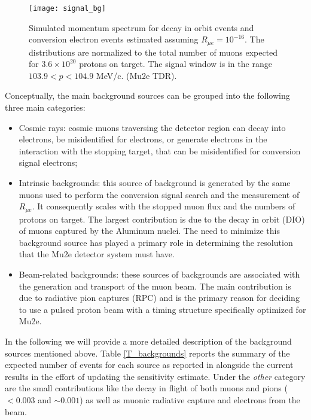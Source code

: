 \documentclass[12pt,a4paper,openright, oneside, titlepage]{book} %
\begin{document}
\begin{figure}[h!]
\centering
\texttt{[image: signal\_bg]}
\caption{Simulated momentum spectrum for decay in orbit events and conversion electron events
estimated assuming $R_{\mu e} = 10 ^{-16}$. 
The distributions are normalized to the total number of muons expected for $3.6 \times 10^{20}$
protons on target. The signal window is in the range
$103.9 < p < 104.9$ MeV/c. (Mu2e TDR).}
\label{_signal_bg}
\end{figure}

\noindent Conceptually, the main background sources can be grouped 
into the following three main categories: 

\begin{itemize}
\item Cosmic rays: cosmic muons traversing the detector region can decay into electrons, 
be misidentified for electrons, or generate electrons in the interaction with the stopping target, 
that can be misidentified for conversion signal electrons; 
\item Intrinsic backgrounds: 
this source of background is generated by the same muons used to perform the conversion signal search 
and the measurement of $R_{\mu e}$. 
It consequently scales with the stopped muon flux and the numbers of protons on target. 
The largest contribution is due to the decay in orbit (DIO) of muons captured by the Aluminum nuclei. 
The need to minimize this background source has played a primary role in determining the resolution
that the Mu2e detector system must have.
\item Beam-related backgrounds: 
these sources of backgrounds are associated with the generation and transport of the muon beam. 
The main contribution is due to radiative pion captures (RPC) and is the primary reason
for deciding to use a pulsed proton beam with a timing structure specifically optimized  for Mu2e. 
\end{itemize}
In the following we will provide a more detailed description of the background sources
mentioned above.
Table \ref{T_backgrounds} reports the summary of the expected number of events 
for each source as reported in \cite{CD3} alongside the current results in the effort of updating the sensitivity estimate. 
Under the \textit{other} category are the small contributions like the decay in flight of both muons and pions ($<0.003$ and $\sim 0.001$) as well as muonic radiative capture and electrons from the beam.

\begin{comment}
\begin{figure}[h!]
\centering
\texttt{[image: CD3\_backgrounds]}
\caption{CD3 backgrounds}
\end{figure}
\end{comment}
\end{document}
